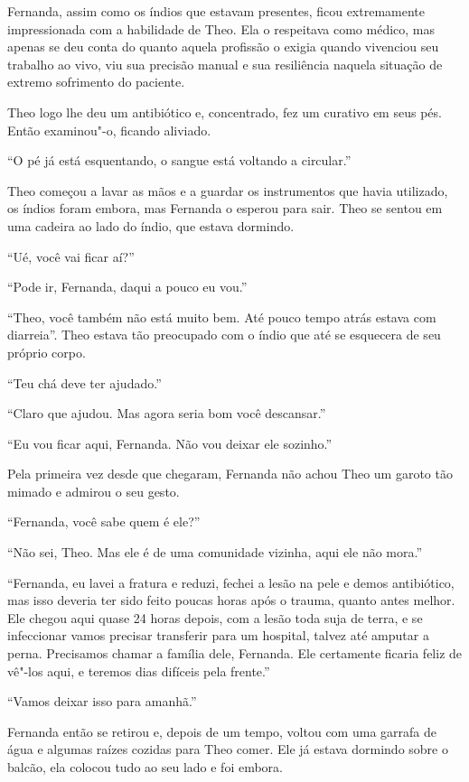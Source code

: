 Fernanda, assim como os índios que estavam presentes, ficou extremamente
impressionada com a habilidade de Theo. Ela o respeitava como médico,
mas apenas se deu conta do quanto aquela profissão o exigia quando
vivenciou seu trabalho ao vivo, viu sua precisão manual e sua
resiliência naquela situação de extremo sofrimento do paciente.

Theo logo lhe deu um antibiótico e, concentrado, fez um curativo em
seus pés. Então examinou"-o, ficando aliviado.

``O pé já está esquentando, o sangue está voltando a circular.''

Theo começou a lavar as mãos e a guardar os instrumentos que havia
utilizado, os índios foram embora, mas Fernanda o esperou para sair.
Theo se sentou em uma cadeira ao lado do índio, que estava dormindo.

``Ué, você vai ficar aí?''

``Pode ir, Fernanda, daqui a pouco eu vou.''

``Theo, você também não está muito bem. Até pouco tempo atrás estava com
diarreia''. Theo estava tão preocupado com o índio que até se esquecera
de seu próprio corpo.

``Teu chá deve ter ajudado.''

``Claro que ajudou. Mas agora seria bom você descansar.''

``Eu vou ficar aqui, Fernanda. Não vou deixar ele sozinho.''

Pela primeira vez desde que chegaram, Fernanda não achou Theo um garoto
tão mimado e admirou o seu gesto.

``Fernanda, você sabe quem é ele?''

``Não sei, Theo. Mas ele é de uma comunidade vizinha, aqui ele não
mora.''

``Fernanda, eu lavei a fratura e reduzi, fechei a lesão na pele e demos
antibiótico, mas isso deveria ter sido feito poucas horas após o
trauma, quanto antes melhor. Ele chegou aqui quase 24 horas depois, com
a lesão toda suja de terra, e se infeccionar vamos precisar transferir
para um hospital, talvez até amputar a perna. Precisamos chamar a
família dele, Fernanda. Ele certamente ficaria feliz de vê"-los aqui, e
teremos dias difíceis pela frente.''

``Vamos deixar isso para amanhã.''

Fernanda então se retirou e, depois de um tempo, voltou com uma garrafa
de água e algumas raízes cozidas para Theo comer. Ele já estava dormindo
sobre o balcão, ela colocou tudo ao seu lado e foi embora.

